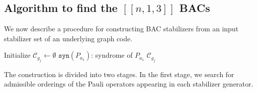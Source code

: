 \documentclass[reprint, amsmath,amssymb, aps,pra,
 floatfix,
]{revtex4-2}
\begin{document}
\subsection{Algorithm to find the \texorpdfstring{$[[n,1,3]]$}{[[n,1,3]]} BACs} 
\noindent We now describe a procedure for constructing BAC stabilizers from an input stabilizer set of an underlying graph code.
{\linespread{1}\selectfont
\begin{algorithm}[ht]
\DontPrintSemicolon
\caption{ Permutation-based construction of stabilizer syndromes}
\label{algo: bare code construction}
\BlankLine
Initialize $\mathcal{C}_{g_{j}} \gets \emptyset$ \;
$\mathtt{syn}(P_{a_\mathtt{i}})$: syndrome of $P_{a_\mathtt{i}}$ \;
\Return $\mathcal{C}_{g_j}$ \;
\end{algorithm}
}
The construction is divided into two stages. 
In the first stage, we search for admissible orderings of the Pauli operators appearing in each stabilizer generator.
\end{document}
